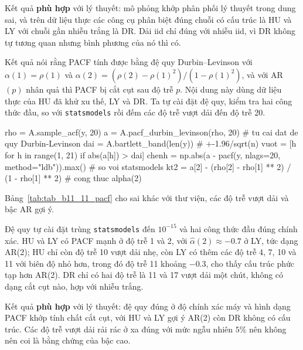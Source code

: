  Kết quả \textbf{phù hợp} với lý thuyết: mô phỏng khớp phân phối lý thuyết trong dung sai, và trên dữ liệu thực các công cụ phân biệt đúng chuỗi có cấu trúc là HU và LY với chuỗi gần nhiễu trắng là DR. Dải iid chỉ đúng với nhiễu iid, vì DR không tự tương quan nhưng bình phương của nó thì có.

 Kết quả  nói rằng PACF tính được bằng đệ quy Durbin--Levinson với $\alpha(1)=\rho(1)$ và $\alpha(2)=(\rho(2)-\rho(1)^2)/(1-\rho(1)^2)$, và với AR$(p)$ nhân quả thì PACF bị cắt cụt sau độ trễ $p$.
 Nội dung này dùng dữ liệu thực của HU đã khử xu thế, LY và DR. Ta tự cài đặt đệ quy, kiểm tra hai công thức đầu, so với \texttt{statsmodels} rồi đếm các độ trễ vượt dải đến độ trễ 20.
\begin{codeblock}
rho = A.sample_acf(y, 20)
a = A.pacf_durbin_levinson(rho, 20)            # tu cai dat de quy Durbin-Levinson
dai = A.bartlett_band(len(y))                  # +-1.96/sqrt(n)
vuot = [h for h in range(1, 21) if abs(a[h]) > dai]
chenh = np.abs(a - pacf(y, nlags=20, method="ldb")).max()    # so voi statsmodels
kt2 = a[2] - (rho[2] - rho[1] ** 2) / (1 - rho[1] ** 2)       # cong thuc alpha(2)
\end{codeblock}
 Bảng~\ref{tab:tab_b11_11_pacf} cho sai khác với thư viện, các độ trễ vượt dải và bậc AR gợi ý.

 Đệ quy tự cài đặt trùng \texttt{statsmodels} đến $10^{-15}$ và hai công thức đầu đúng chính xác. HU và LY có PACF mạnh ở độ trễ 1 và 2, với $\hat\alpha(2)\approx-0.7$ ở LY, tức dạng AR(2); HU chỉ còn độ trễ 10 vượt dải nhẹ, còn LY có thêm các độ trễ 4, 7, 10 và 11 với biên độ nhỏ hơn, trong đó độ trễ 11 khoảng $-0.3$, cho thấy cấu trúc phức tạp hơn AR(2). DR chỉ có hai độ trễ là 11 và 17 vượt dải một chút, không có dạng cắt cụt nào, hợp với nhiễu trắng.

 Kết quả \textbf{phù hợp} với lý thuyết: đệ quy đúng ở độ chính xác máy và hình dạng PACF khớp tính chất cắt cụt, với HU và LY gợi ý AR(2) còn DR không có cấu trúc. Các độ trễ vượt dải rải rác ở xa đúng với mức ngẫu nhiên $5\%$ nên không nên coi là bằng chứng của bậc cao.

